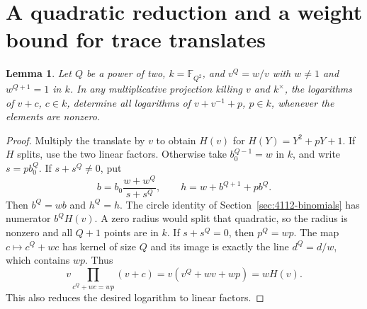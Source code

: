 \documentclass[11pt]{article}
\newtheorem{lemma}[theorem]{Lemma}
\begin{document}
\section{A quadratic reduction and a weight bound for trace translates}
\label{sec:4112-traces}

\begin{lemma}
Let \(Q\) be a power of two, \(k=\mathbb F_{Q^2}\), and
\(v^Q=w/v\) with \(w\ne1\) and \(w^{Q+1}=1\) in \(k\).
In any multiplicative projection killing \(v\) and \(k^\times\),
the logarithms of \(v+c\), \(c\in k\), determine all logarithms
of \(v+v^{-1}+p\), \(p\in k\), whenever the elements are nonzero.
\end{lemma}
\begin{proof}
Multiply the translate by \(v\) to obtain \(H(v)\) for
\(H(Y)=Y^2+pY+1\). If \(H\) splits, use the two linear factors.
Otherwise take \(b_0^{Q-1}=w\) in \(k\), and write
\(s=p b_0^Q\). If \(s+s^Q\ne0\), put
\[
 b=b_0\frac{w+w^Q}{s+s^Q},\qquad h=w+b^{Q+1}+p b^Q .
\]
Then \(b^Q=wb\) and \(h^Q=h\). The circle identity of
Section~\ref{sec:4112-binomials} has numerator \(b^QH(v)\).
A zero radius would split that quadratic, so the radius is nonzero
and all \(Q+1\) points are in \(k\).
If \(s+s^Q=0\), then \(p^Q=wp\).
The map \(c\mapsto c^Q+wc\) has kernel of size \(Q\) and
its image is exactly the line \(d^Q=d/w\), which contains \(wp\).
Thus
\[
 v\!\prod_{c^Q+wc=wp}(v+c)=v(v^Q+wv+wp)=w H(v).
\]
This also reduces the desired logarithm to linear factors.
\end{proof}
\end{document}
